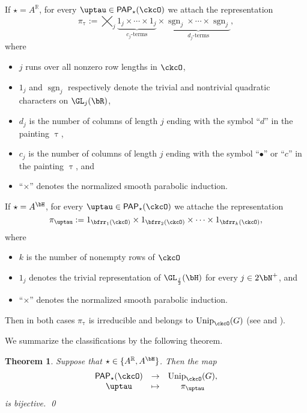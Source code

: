 \documentclass[12pt,a4paper]{amsart}
\newcommand{\sgn}{\operatorname{sgn}}
\newcommand{\R}{\mathbb R}
\numberwithin{equation}{section}
\newtheorem{thm}{Theorem}[section]
\theoremstyle{remark}
\def\cf{\emph{cf.} }
\def\Unip{\mathrm{Unip}}
\def\PP{\mathsf{PAP}}
\begin{document}
If $\star=A^\R$, for every
$\uptau\in \PP_{\star}(\ckcO)$ we attach the representation
\begin{equation}\label{eq:u.GLR}
  \pi_\uptau :=
  \bigtimes_{j} \underbrace{1_j \times \cdots \times 1_j}_{c_j\text{-terms}}\times
  \underbrace{\sgn_j \times \cdots \times {\sgn_j} }_{d_j\text{-terms}},
\end{equation}
where
\begin{itemize}
  \item $j$ runs over all nonzero row lengths in $\ckcO$,
  \item $1_j$ and $\sgn_j$ respectively denote the trivial and nontrivial quadratic characters on $\GL_j(\bR)$,
  \item $d_j$ is the number of columns of length $j$ ending with the symbol
        ``$d$'' in the painting $\uptau$,
  \item $c_j$ is the number of columns of length $j$ ending with the symbol
        ``$\bullet$'' or ``$c$'' in the painting $\uptau$, and
  \item ``$\times$'' denotes the normalized smooth parabolic induction.
\end{itemize}
If $\star=A^\bH$, for every
$\uptau\in \PP_{\star}(\ckcO)$ we attache the representation
\begin{equation}\label{eq:u.GLR}
  \pi_\uptau :=
 1_{\bfrr_1(\ckcO)}\times 1_{\bfrr_2(\ckcO)} \times \cdots
   \times  1_{\bfrr_k(\ckcO)},
\end{equation}
where
\begin{itemize}
  \item$k$ is the number of nonempty rows of $\ckcO$
\item $1_j$ denotes the trivial representation of $\GL_{\frac{j}{2}}(\bH)$ for every $j\in 2\bN^+$, and
  \item ``$\times$'' denotes the normalized smooth parabolic induction.
\end{itemize}
Then in both cases $\pi_{\uptau}$ is irreducible and belongs to $\Unip_{\ckcO}(G)$ (see  \cite[Theorem 3.8]{V.GL} and \cite[Example~27.5]{ABV}).

We summarize the classifications by the following theorem. 

\begin{thm}%
 \label{thm:mainR00}
Suppose that  $\star\in \{A^\R, A^\bH\}$. Then the map
  \[
    \begin{array}{ccc}
      \PP_{\star}(\ckcO) & \rightarrow & \Unip_{\ckcO}(G),\\
      \uptau & \mapsto & \pi_{\uptau}
    \end{array}
  \]
  is bijective. \qed
\end{thm}
\end{document}

